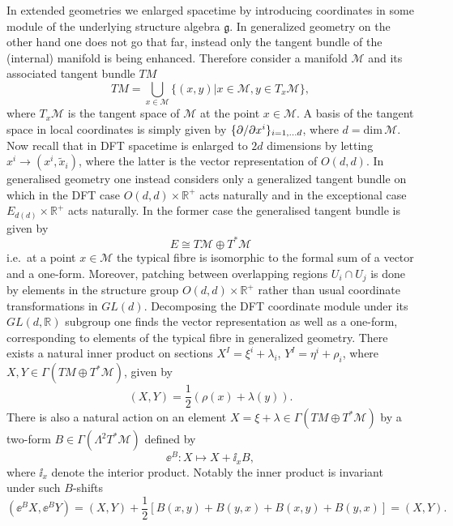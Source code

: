 In extended geometries we enlarged spacetime by introducing coordinates in some module of the underlying structure algebra $\mathfrak{g}$. In generalized geometry on the other hand one does not go that far, instead only the tangent bundle of the (internal) manifold is being enhanced.  Therefore consider a manifold $\mathcal{M}$ and its associated tangent bundle $TM$ 
\begin{equation}
    TM = \bigcup_{x\in \mathcal{M}}\{(x,y)|x\in\mathcal{M}, y\in T_x\mathcal{M} \},
\end{equation}
where $T_x\mathcal{M}$ is the tangent space of $\mathcal{M}$ at the point $x\in\mathcal{M}$. A basis of the tangent space in local coordinates is simply given by $\{\partial/\partial x^i\}_{i=1,\ldots d}$, where $d=\text{dim}\,\mathcal{M}$. Now recall that in DFT spacetime is enlarged to $2d$ dimensions by letting $x^i\to (x^i,\tilde{x}_i)$, where the latter is the vector representation of $O(d,d)$. In generalised geometry one instead considers only a generalized tangent bundle on which in the DFT case $O(d,d)\times \mathbb{R}^+$ acts naturally and in the exceptional case $E_{d(d)}\times\mathbb{R}^+$ acts naturally.  In the former case the generalised tangent bundle is given by 
\begin{equation}\label{eq:GenTangentBundleDef}
E \cong T\mathcal{M}\oplus T^*\mathcal{M}
\end{equation}
i.e.\ at a point $x\in\mathcal{M}$ the typical fibre is isomorphic to the formal sum of a vector and a one-form. Moreover, patching between overlapping regions $U_i\cap U_j$ is done by elements in the structure group $O(d,d)\times\mathbb{R}^+$ rather than usual coordinate transformations in $GL(d)$. Decomposing the DFT coordinate module under its $GL(d,\mathbb{R})$ subgroup one finds the vector representation as well as a one-form, corresponding to elements of the typical fibre in generalized geometry. There exists a natural inner product on sections $X^I=\xi^i+\lambda_i$, $Y^I=\eta^i+\rho_i$, where $X,Y\in\Gamma(TM\oplus T^*\mathcal{M})$, given by
\begin{equation}
    (X,Y) = \frac{1}{2}\left(\rho(x)+\lambda(y)\right).
\end{equation}
There is also a natural action on an element $X=\xi+\lambda\in \Gamma(TM\oplus T^*\mathcal{M})$ by a two-form $B\in \Gamma(\Lambda^2T^*\mathcal{M})$ defined by 
\begin{equation}
    \ee^B: X\mapsto X+\ii_xB,
\end{equation}
where $\ii_x$ denote the interior product. Notably the inner product is invariant under such $B$-shifts
\begin{equation}
    (\ee^B X,\ee^BY) = (X,Y)+\frac{1}{2}\left[B(x,y)+B(y,x)+B(x,y)+B(y,x)\right]=(X,Y).
\end{equation}

